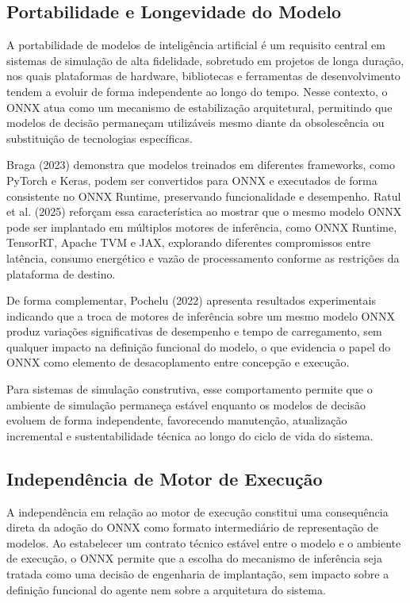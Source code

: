 \subsection{Portabilidade e Longevidade do Modelo}

A portabilidade de modelos de inteligência artificial é um requisito central em sistemas de simulação de alta fidelidade, sobretudo em projetos de longa duração, nos quais plataformas de hardware, bibliotecas e ferramentas de desenvolvimento tendem a evoluir de forma independente ao longo do tempo. Nesse contexto, o ONNX atua como um mecanismo de estabilização arquitetural, permitindo que modelos de decisão permaneçam utilizáveis mesmo diante da obsolescência ou substituição de tecnologias específicas.

Braga (2023) demonstra que modelos treinados em diferentes frameworks, como PyTorch e Keras, podem ser convertidos para ONNX e executados de forma consistente no ONNX Runtime, preservando funcionalidade e desempenho. Ratul et al. (2025) reforçam essa característica ao mostrar que o mesmo modelo ONNX pode ser implantado em múltiplos motores de inferência, como ONNX Runtime, TensorRT, Apache TVM e JAX, explorando diferentes compromissos entre latência, consumo energético e vazão de processamento conforme as restrições da plataforma de destino.

De forma complementar, Pochelu (2022) apresenta resultados experimentais indicando que a troca de motores de inferência sobre um mesmo modelo ONNX produz variações significativas de desempenho e tempo de carregamento, sem qualquer impacto na definição funcional do modelo, o que evidencia o papel do ONNX como elemento de desacoplamento entre concepção e execução.

Para sistemas de simulação construtiva, esse comportamento permite que o ambiente de simulação permaneça estável enquanto os modelos de decisão evoluem de forma independente, favorecendo manutenção, atualização incremental e sustentabilidade técnica ao longo do ciclo de vida do sistema.

\subsection{Independência de Motor de Execução}

A independência em relação ao motor de execução constitui uma consequência direta da adoção do ONNX como formato intermediário de representação de modelos. Ao estabelecer um contrato técnico estável entre o modelo e o ambiente de execução, o ONNX permite que a escolha do mecanismo de inferência seja tratada como uma decisão de engenharia de implantação, sem impacto sobre a definição funcional do agente nem sobre a arquitetura do sistema.

